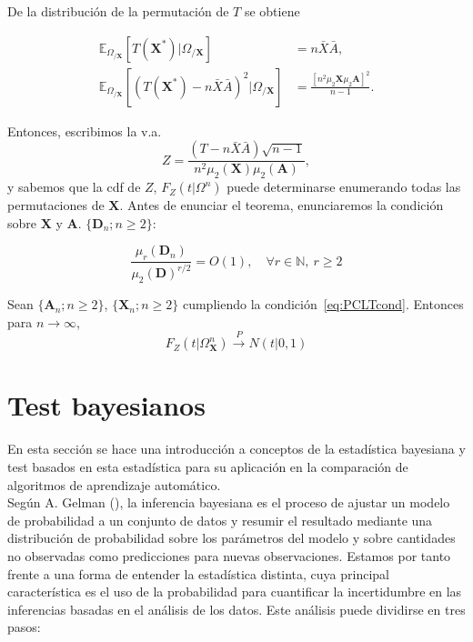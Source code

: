 	De la distribución de la permutación de $T$ se obtiene

\begin{align*}
	\mathbb{E}_{\Omega_{/\mathbf{X}}} \left[
		T(\mathbf{X}^*) | \Omega_{/\mathbf{X}}
		\right] &=
		n \bar{X} \bar{A}, \\
	\mathbb{E}_{\Omega_{/\mathbf{X}}} \left[
		(T(\mathbf{X}^*) - n\bar{X}\bar{A})^2 | 
			\Omega_{/\mathbf{X}}
		\right] &=
		\frac{[n^2 \mu_2{\mathbf{X}} \mu_2{\mathbf{A}}]^2}
			{n-1}.
\end{align*}

	Entonces, escribimos la v.a.
	\[
		Z = \frac{(T - n \bar{X} \bar{A})\sqrt{n-1}}
				{n^2 \mu_2(\mathbf{X}) \mu_2(\mathbf{A})},
	\]
	y sabemos que la cdf de $Z$, $F_Z(t|\Omega^n)$ puede 
determinarse enumerando todas las permutaciones de 
$\mathbf{X}$. Antes de enunciar el teorema, enunciaremos la 
condición sobre $\mathbf{X}$ y $\mathbf{A}$. 
$\{ \mathbf{D}_n; n \geq 2 \}$:

\begin{equation}
	 \label{eq:PCLTcond}
	 \tag{C.1}
	 \frac{\mu_r(\mathbf{D}_n)}
	 		{\mu_2(\mathbf{D})^{r/2}} = O(1),\quad
	 		\forall r \in \mathbb{N},\ r \geq 2
\end{equation}

\begin{teorema}
	Sean $\{\mathbf{A}_n; n \geq 2\}$, $\{\mathbf{X}_n; 
n \geq 2\}$ cumpliendo la condición~\ref{eq:PCLTcond}. 
Entonces para $n \rightarrow \infty$,
	\[ F_Z(t | \Omega^n_{\mathbf{X}}) 
		\overset{P}{\rightarrow} \mathit{N}(t | 0,1)
	\]
	\label{th:PCTL}
\end{teorema}


\chapter{Test bayesianos}	
\label{chapter:test_bayesianos}

	En esta sección se hace una introducción a conceptos de 
la estadística bayesiana y test basados en esta estadística
para su aplicación en la comparación de algoritmos de
aprendizaje automático.\\
	Según A. Gelman (\cite{Gelman03-105949}), la inferencia 
bayesiana es el proceso de ajustar un modelo de probabilidad 
a un conjunto de datos y resumir el resultado  mediante una 
distribución de probabilidad sobre los  parámetros del modelo 
y sobre cantidades no observadas como predicciones para 
nuevas observaciones. Estamos por tanto frente a una 
forma de entender la estadística distinta, cuya principal
característica es el uso de la probabilidad para 
cuantificar la incertidumbre en las inferencias basadas en
el análisis de los datos. Este análisis puede dividirse en
tres pasos:

